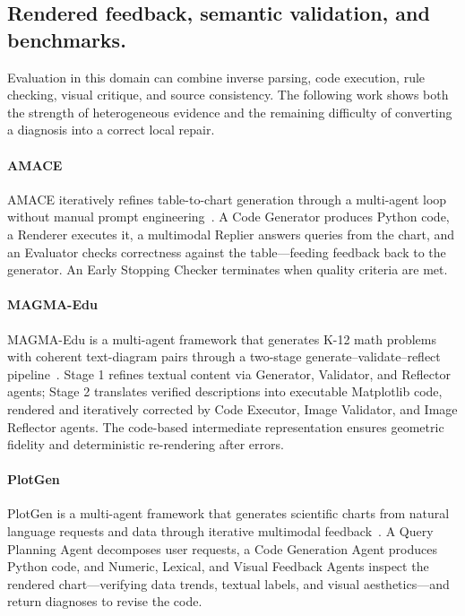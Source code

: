 \subsection{Rendered feedback, semantic validation, and benchmarks.}
Evaluation in this domain can combine inverse parsing, code execution, rule checking, visual critique, and source consistency. The following work shows both the strength of heterogeneous evidence and the remaining difficulty of converting a diagnosis into a correct local repair.

\paragraph{AMACE}
AMACE iteratively refines table-to-chart generation through a multi-agent loop without manual prompt engineering~\cite{namgoong2025amace}. A Code Generator produces Python code, a Renderer executes it, a multimodal Replier answers queries from the chart, and an Evaluator checks correctness against the table—feeding feedback back to the generator. An Early Stopping Checker terminates when quality criteria are met.



\paragraph{MAGMA-Edu}
MAGMA-Edu is a multi-agent framework that generates K-12 math problems with coherent text-diagram pairs through a two-stage generate–validate–reflect pipeline~\cite{avg251118714}. Stage 1 refines textual content via Generator, Validator, and Reflector agents; Stage 2 translates verified descriptions into executable Matplotlib code, rendered and iteratively corrected by Code Executor, Image Validator, and Image Reflector agents. The code-based intermediate representation ensures geometric fidelity and deterministic re-rendering after errors. 


\paragraph{PlotGen}
PlotGen is a multi-agent framework that generates scientific charts from natural language requests and data through iterative multimodal feedback~\cite{goswami2025plotgen}. A Query Planning Agent decomposes user requests, a Code Generation Agent produces Python code, and Numeric, Lexical, and Visual Feedback Agents inspect the rendered chart—verifying data trends, textual labels, and visual aesthetics—and return diagnoses to revise the code. 

